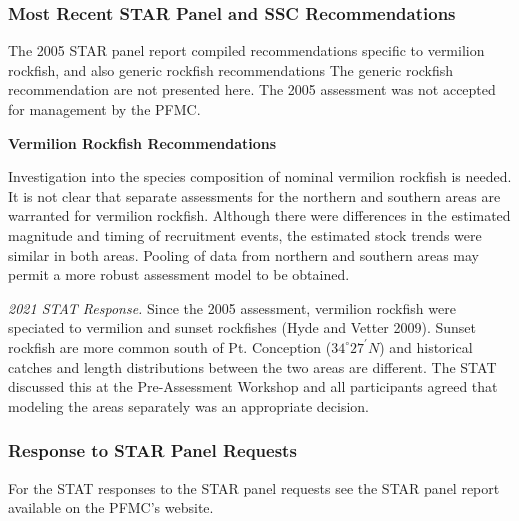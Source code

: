 \documentclass[11pt,
  english,
]{article}
\begin{document}

\hypertarget{most-recent-star-panel-and-ssc-recommendations}{%
\subsubsection{Most Recent STAR Panel and SSC Recommendations}\label{most-recent-star-panel-and-ssc-recommendations}}

\leavevmode\tagmcend\tagstructend

The 2005 STAR panel report compiled recommendations specific to vermilion rockfish, and also generic rockfish recommendations The generic rockfish recommendation are not presented here. The 2005 assessment was not accepted for management by the PFMC.

\textbf{Vermilion Rockfish Recommendations}

Investigation into the species composition of nominal vermilion rockfish is needed. It is not clear that separate assessments for the northern and southern areas are warranted for vermilion rockfish. Although there were differences in the estimated magnitude and timing of recruitment events, the estimated stock trends were similar in both areas. Pooling of data from northern and southern areas may permit a more robust assessment model to be obtained.

\emph{2021 STAT Response.} Since the 2005 assessment, vermilion rockfish were speciated to vermilion and sunset rockfishes {(Hyde and Vetter 2009)\leavevmode\tagmcend\tagstructend}. Sunset rockfish are more common south of Pt. Conception ($34^\circ 27^\prime N$) and historical catches and length distributions between the two areas are different. The STAT discussed this at the Pre-Assessment Workshop and all participants agreed that modeling the areas separately was an appropriate decision.


\hypertarget{response-to-star-panel-requests}{%
\subsubsection{Response to STAR Panel Requests}\label{response-to-star-panel-requests}}

\leavevmode\tagmcend\tagstructend

For the STAT responses to the STAR panel requests see the STAR panel report available on the PFMC's website.
\end{document}
